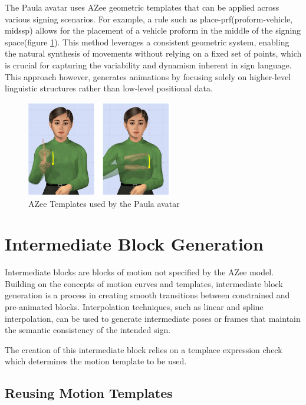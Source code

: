 \documentclass[../../main.tex]{subfiles}
\begin{document}
The Paula avatar uses AZee geometric templates that can be applied across various signing scenarios. For example, a rule such as place-prf(proform-vehicle, midssp) allows for the placement of a vehicle proform in the middle of the signing space(figure \ref{fig:azee_template_example}). This method leverages a consistent geometric system, enabling the natural synthesis of movements without relying on a fixed set of points, which is crucial for capturing the variability and dynamism inherent in sign language. This approach however, generates animations by focusing solely on higher-level linguistic structures rather than low-level positional data.

\begin{figure}
    \centering \includegraphics[width = 2.5in]{chapters/intermediate_blocks/images/azee_template_example.png}
    \caption{AZee Templates used by the Paula avatar}
    \label{fig:azee_template_example}
\end{figure}

\section{Intermediate Block Generation}
\label{ch:intermediate_blocks:intermediate_block_generation}

Intermediate blocks are blocks of motion not specified by the AZee model. Building on the concepts of motion curves and templates, intermediate block generation is a process in creating smooth transitions between constrained and pre-animated blocks. Interpolation techniques, such as linear and spline interpolation, can be used to generate intermediate poses or frames that maintain the semantic consistency of the intended sign.

The creation of this intermediate block relies on a templace expression check which determines the motion template to be used. 

\subsection{Reusing Motion Templates}
\label{ch:intermediate_blocks:reusing_motion_templates}
\end{document}
